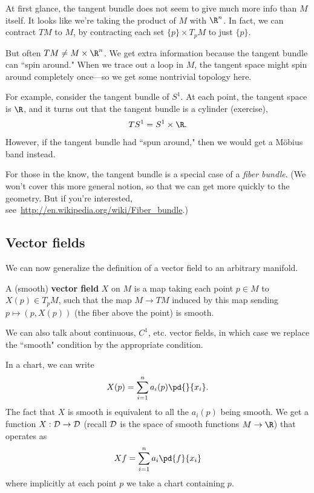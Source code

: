 At first glance, the tangent bundle does not seem to give much more info than $M$ itself. It looks like we're taking the product of $M$ with $\R^n$. In fact, we can contract $TM$ to $M$, by contracting each set $\{p\} \times T_pM$ to just $\{p\}$.

But often $TM\ne M\times\R^n$. We get extra information because the tangent bundle can ``spin around." When we trace out a loop in $M$, the tangent space might spin around completely once---so we get some nontrivial topology here. 

For example, consider the tangent bundle of $S^1$. At each point, the tangent space is $\R$, and it turns out that the tangent bundle is a cylinder (exercise),
\[TS^1=S^1\times \R.\]
However, if the tangent bundle had ``spun around," then we would get a M\"obius band instead.

For those in the know, the tangent bundle is a special case of a {\it fiber bundle}. (We won't cover this more general notion, so that we can get more quickly to the geometry. But if you're interested, see~\url{http://en.wikipedia.org/wiki/Fiber_bundle}.)

\subsection{Vector fields}

We can now generalize the definition of a vector field to an arbitrary manifold.

\begin{df}
A (smooth) \textbf{vector field} $X$ on $M$ is a map taking each point $p\in M$ to $X(p)\in T_pM$, such that the map $M\to TM$ induced by this map sending $p\mapsto (p,X(p))$ (the fiber above the point) is smooth.
\end{df}
We can also talk about continuous, $C^1$, etc. vector fields, in which case we replace the ``smooth" condition by the appropriate condition.


In a chart, we can write
\[
X(p)=\sum_{i=1}^n a_i(p)\pd{}{x_i}.
\]%
The fact that $X$ is smooth is equivalent to all the $a_i(p)$ being smooth. We get a function $X:\cal D\to \cal D$ (recall $\cal D$ is the space of smooth functions $M\to \R$) that operates as
\[
Xf=\sum_{i=1}^n a_i\pd{f}{x_i}
\]
where implicitly at each point $p$ we take a chart containing $p$.

